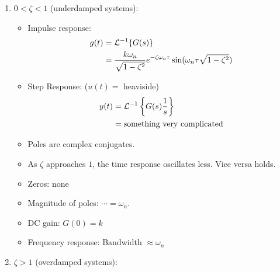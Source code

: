 \begin{enumerate}
\begin{enumerate}
                \begin{enumerate}
                    \item $ 0 < \zeta < 1$ (underdamped systems):
                        \begin{itemize}
                            \item Impulse response:
                                \begin{align*}
                                    g(t) &= \mathcal{L}^{-1}\{G(s)\} \\
                                    &= \frac{k\omega_n}{\sqrt{1-\zeta^2}} e^{-\zeta \omega_n \tau} \sin(\omega_n \tau \sqrt{1-\zeta^2} )
                                \end{align*}
                            \item Step Response: ($u(t) = $ heaviside)
                                \begin{align*}
                                    y(t) &= \mathcal{L}^{-1} \left\{ G(s) \frac{1}{s} \right\}
                                    \\&= \text{something very complicated}
                                \end{align*}
                            \item Poles are complex conjugates.
                            \item As $\zeta$ approaches $1$, the time response oscillates less. Vice versa holds.
                            \item Zeros: none
                            \item Magnitude of poles: $\cdots = \omega_n$.
                            \item DC gain: $G(0) = k$
                            \item Frequency response: Bandwidth $\approx \omega_n$
                        \end{itemize}

                    \item $ \zeta > 1$ (overdamped systems):


\end{enumerate}
\end{enumerate}
\end{enumerate}
